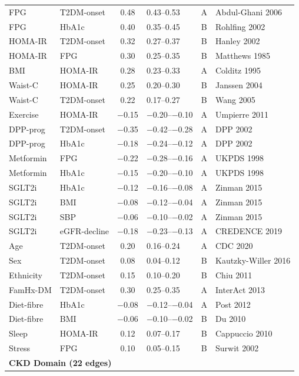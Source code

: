 \documentclass[runningheads]{llncs}
\begin{document}
{\begin{longtable}{@{}p{2.0cm}p{2.0cm}cp{1.4cm}cp{2.8cm}@{}}
FPG & T2DM-onset & 0.48 & 0.43--0.53 & A & Abdul-Ghani 2006 \\
FPG & HbA1c & 0.40 & 0.35--0.45 & B & Rohlfing 2002 \\
HOMA-IR & T2DM-onset & 0.32 & 0.27--0.37 & B & Hanley 2002 \\
HOMA-IR & FPG & 0.30 & 0.25--0.35 & B & Matthews 1985 \\
BMI & HOMA-IR & 0.28 & 0.23--0.33 & A & Colditz 1995 \\
Waist-C & HOMA-IR & 0.25 & 0.20--0.30 & B & Janssen 2004 \\
Waist-C & T2DM-onset & 0.22 & 0.17--0.27 & B & Wang 2005 \\
Exercise & HOMA-IR & $-$0.15 & $-$0.20--$-$0.10 & A & Umpierre 2011 \\
DPP-prog & T2DM-onset & $-$0.35 & $-$0.42--$-$0.28 & A & DPP 2002 \\
DPP-prog & HbA1c & $-$0.18 & $-$0.24--$-$0.12 & A & DPP 2002 \\
Metformin & FPG & $-$0.22 & $-$0.28--$-$0.16 & A & UKPDS 1998 \\
Metformin & HbA1c & $-$0.15 & $-$0.20--$-$0.10 & A & UKPDS 1998 \\
SGLT2i & HbA1c & $-$0.12 & $-$0.16--$-$0.08 & A & Zinman 2015 \\
SGLT2i & BMI & $-$0.08 & $-$0.12--$-$0.04 & A & Zinman 2015 \\
SGLT2i & SBP & $-$0.06 & $-$0.10--$-$0.02 & A & Zinman 2015 \\
SGLT2i & eGFR-decline & $-$0.18 & $-$0.23--$-$0.13 & A & CREDENCE 2019 \\
Age & T2DM-onset & 0.20 & 0.16--0.24 & A & CDC 2020 \\
Sex & T2DM-onset & 0.08 & 0.04--0.12 & B & Kautzky-Willer 2016 \\
Ethnicity & T2DM-onset & 0.15 & 0.10--0.20 & B & Chiu 2011 \\
FamHx-DM & T2DM-onset & 0.30 & 0.25--0.35 & A & InterAct 2013 \\
Diet-fibre & HbA1c & $-$0.08 & $-$0.12--$-$0.04 & A & Post 2012 \\
Diet-fibre & BMI & $-$0.06 & $-$0.10--$-$0.02 & B & Du 2010 \\
Sleep & HOMA-IR & 0.12 & 0.07--0.17 & B & Cappuccio 2010 \\
Stress & FPG & 0.10 & 0.05--0.15 & B & Surwit 2002 \\
\midrule
\multicolumn{6}{l}{\textbf{CKD Domain (22 edges)}} \\

\end{longtable}}
\end{document}
